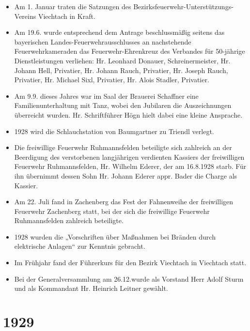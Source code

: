 \documentclass[12pt,a4paper]{book}
\begin{document}
\begin{itemize}
\item Am 1. Januar traten die Satzungen des Bezirksfeuerwehr-Unterstützungs-
Vereins Viechtach in Kraft.

\item Am 19.6. wurde entsprechend dem Antrage beschlussmäßig seitens das
bayerischen Landes-Feuerwehrausschlusses an nachstehende Feuerwehrkameraden das
Feuerwehr-Ehrenkreuz des Verbandes für 50-jährige Dienstleistungen verliehen:
Hr. Leonhard Donauer, Schreinermeister, Hr. Johann Hell, Privatier, Hr. Johann
Rauch, Privatier, Hr. Joseph Rauch, Privatier, Hr. Michael Sixl, Privatier, Hr.
Alois Stadler, Privatier.

\item Am 9.9. dieses Jahres war im Saal der Brauerei Schaffner eine
Familienunterhaltung mit Tanz, wobei den Jubilaren die Auszeichnungen überreicht
wurden. Hr. Schriftführer Högn hielt dabei eine kleine Ansprache.

\item 1928 wird die Schlauchstation von Baumgartner zu Triendl verlegt.

\item Die freiwillige Feuerwehr Ruhmannsfelden beteiligte sich zahlreich an der
Beerdigung des verstorbenen langjährigen verdienten Kassiers der freiwilligen
Feuerwehr Ruhmannsfelden, Hr. Wilhelm Ederer, der am 16.8.1928 starb. Für ihn
übernimmt dessen Sohn Hr. Johann Ederer appr. Bader die Charge als Kassier.

\item Am 22. Juli fand in Zachenberg das Fest der Fahnenweihe der freiwilligen
Feuerwehr Zachenberg statt, bei der sich die freiwillige Feuerwehr
Ruhmannsfelden zahlreich beteiligte.

\item 1928 wurden die „Vorschriften über Maßnahmen bei Bränden durch elektrische
Anlagen“ zur Kenntnis gebracht.

\item Im Frühjahr fand der Führerkurs für den Bezirk Viechtach in Viechtach
statt.

\item Bei der Generalversammlung am 26.12.wurde als Vorstand Herr Adolf Sturm
und als Kommandant Hr. Heinrich Leitner gewählt.
\end{itemize}

\section*{1929}
\end{document}
